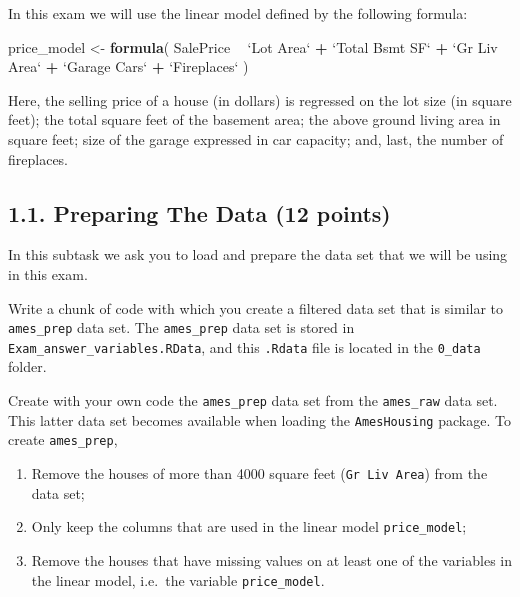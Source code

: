 \documentclass[]{article}
\newenvironment{Shaded}{\begin{snugshade}}{\end{snugshade}}
\newcommand{\KeywordTok}[1]{\textcolor[rgb]{0.13,0.29,0.53}{\textbf{#1}}}
\newcommand{\DataTypeTok}[1]{\textcolor[rgb]{0.13,0.29,0.53}{#1}}
\newcommand{\StringTok}[1]{\textcolor[rgb]{0.31,0.60,0.02}{#1}}
\newcommand{\OperatorTok}[1]{\textcolor[rgb]{0.81,0.36,0.00}{\textbf{#1}}}
\newcommand{\NormalTok}[1]{#1}
\begin{document}
In this exam we will use the linear model defined by the following
formula:

\begin{Shaded}
\begin{Highlighting}[]
\NormalTok{price_model <-}\StringTok{ }\KeywordTok{formula}\NormalTok{(}
\NormalTok{  SalePrice }\OperatorTok{~}\StringTok{ `}\DataTypeTok{Lot Area}\StringTok{`} \OperatorTok{+}\StringTok{ `}\DataTypeTok{Total Bsmt SF}\StringTok{`} \OperatorTok{+}\StringTok{ }
\StringTok{    `}\DataTypeTok{Gr Liv Area}\StringTok{`} \OperatorTok{+}\StringTok{ `}\DataTypeTok{Garage Cars}\StringTok{`} \OperatorTok{+}\StringTok{ `}\DataTypeTok{Fireplaces}\StringTok{`}
\NormalTok{)}
\end{Highlighting}
\end{Shaded}

Here, the selling price of a house (in dollars) is regressed on the lot
size (in square feet); the total square feet of the basement area; the
above ground living area in square feet; size of the garage expressed in
car capacity; and, last, the number of fireplaces.

\subsection{1.1. Preparing The Data (12
points)}\label{preparing-the-data-12-points}

In this subtask we ask you to load and prepare the data set that we will
be using in this exam.

Write a chunk of code with which you create a filtered data set that is
similar to \texttt{ames\_prep} data set. The \texttt{ames\_prep} data
set is stored in \texttt{Exam\_answer\_variables.RData}, and this
\texttt{.Rdata} file is located in the \texttt{0\_data} folder.

Create with your own code the \texttt{ames\_prep} data set from the
\texttt{ames\_raw} data set. This latter data set becomes available when
loading the \texttt{AmesHousing} package. To create \texttt{ames\_prep},

\begin{enumerate}
\def\labelenumi{\arabic{enumi}.}
\item
  Remove the houses of more than 4000 square feet
  (\texttt{Gr\ Liv\ Area}) from the data set;
\item
  Only keep the columns that are used in the linear model
  \texttt{price\_model};
\item
  Remove the houses that have missing values on at least one of the
  variables in the linear model, i.e.~the variable
  \texttt{price\_model}.
\end{enumerate}
\end{document}
